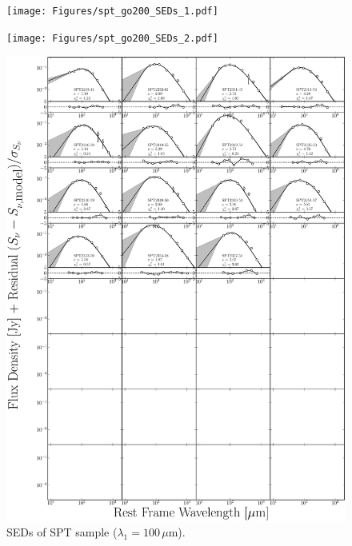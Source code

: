 \begin{figure}
	\centering
	\texttt{[image: Figures/spt\_go200\_SEDs\_1.pdf]}
\end{figure}
\begin{figure}
	\centering
	\texttt{[image: Figures/spt\_go200\_SEDs\_2.pdf]}
\end{figure}
\begin{figure}
	\centering
	\includegraphics[width=\columnwidth]{Figures/spt_go200_SEDs_3.pdf}
	\caption[SEDs of SPT sample ($\lambda_1 = 200\,\mu$m)]{SEDs of SPT sample ($\lambda_1 = 100\,\mu$m).}
\end{figure}
